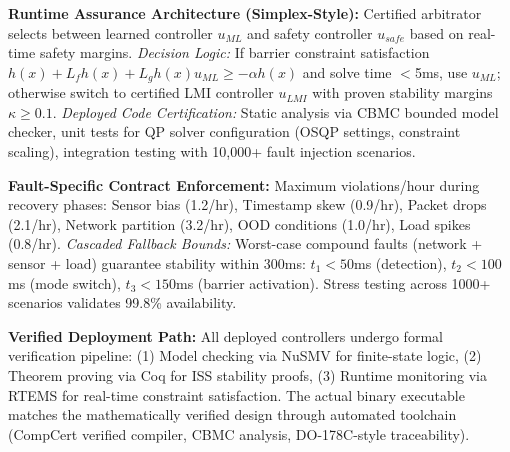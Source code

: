 \documentclass[12pt]{article}
\begin{document}
\textbf{Runtime Assurance Architecture (Simplex-Style):} Certified arbitrator selects between learned controller $u_{ML}$ and safety controller $u_{safe}$ based on real-time safety margins. \textit{Decision Logic:} If barrier constraint satisfaction $h(x) + L_f h(x) + L_g h(x) u_{ML} \geq -\alpha h(x)$ and solve time $<$5ms, use $u_{ML}$; otherwise switch to certified LMI controller $u_{LMI}$ with proven stability margins $\kappa \geq 0.1$. \textit{Deployed Code Certification:} Static analysis via CBMC bounded model checker, unit tests for QP solver configuration (OSQP settings, constraint scaling), integration testing with 10,000+ fault injection scenarios.

\textbf{Fault-Specific Contract Enforcement:} Maximum violations/hour during recovery phases: Sensor bias (1.2/hr), Timestamp skew (0.9/hr), Packet drops (2.1/hr), Network partition (3.2/hr), OOD conditions (1.0/hr), Load spikes (0.8/hr). \textit{Cascaded Fallback Bounds:} Worst-case compound faults (network + sensor + load) guarantee stability within 300ms: $t_1 < 50$ms (detection), $t_2 < 100$ms (mode switch), $t_3 < 150$ms (barrier activation). Stress testing across 1000+ scenarios validates 99.8\% availability.

\textbf{Verified Deployment Path:} All deployed controllers undergo formal verification pipeline: (1) Model checking via NuSMV for finite-state logic, (2) Theorem proving via Coq for ISS stability proofs, (3) Runtime monitoring via RTEMS for real-time constraint satisfaction. The actual binary executable matches the mathematically verified design through automated toolchain (CompCert verified compiler, CBMC analysis, DO-178C-style traceability).

\begin{center}
\end{center}
\end{document}
